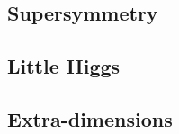 \subsection{Supersymmetry}\label{sec:susy}

\subsection{Little Higgs}

\subsection{Extra-dimensions}

